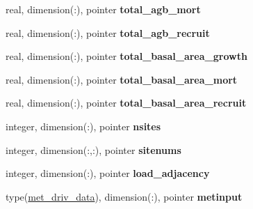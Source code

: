\begin{DoxyCompactItemize}
\item 
\hypertarget{structed__state__vars_1_1edtype_ae5714f7fd8d2db8b5a9487b7b77f53b7}{
real, dimension(:), pointer {\bfseries total\_\-agb\_\-mort}}
\label{structed__state__vars_1_1edtype_ae5714f7fd8d2db8b5a9487b7b77f53b7}

\item 
\hypertarget{structed__state__vars_1_1edtype_a551f812aa8bd6debc688863698d9cb92}{
real, dimension(:), pointer {\bfseries total\_\-agb\_\-recruit}}
\label{structed__state__vars_1_1edtype_a551f812aa8bd6debc688863698d9cb92}

\item 
\hypertarget{structed__state__vars_1_1edtype_abe5c6cdc1e2af3f2274e2bc0010025ec}{
real, dimension(:), pointer {\bfseries total\_\-basal\_\-area\_\-growth}}
\label{structed__state__vars_1_1edtype_abe5c6cdc1e2af3f2274e2bc0010025ec}

\item 
\hypertarget{structed__state__vars_1_1edtype_adee028cbf99464428f52e959dad4db6e}{
real, dimension(:), pointer {\bfseries total\_\-basal\_\-area\_\-mort}}
\label{structed__state__vars_1_1edtype_adee028cbf99464428f52e959dad4db6e}

\item 
\hypertarget{structed__state__vars_1_1edtype_a5a97c672ecc796920deb697f143fa16a}{
real, dimension(:), pointer {\bfseries total\_\-basal\_\-area\_\-recruit}}
\label{structed__state__vars_1_1edtype_a5a97c672ecc796920deb697f143fa16a}

\item 
\hypertarget{structed__state__vars_1_1edtype_aff6419cc579a89670113274fda53a267}{
integer, dimension(:), pointer {\bfseries nsites}}
\label{structed__state__vars_1_1edtype_aff6419cc579a89670113274fda53a267}

\item 
\hypertarget{structed__state__vars_1_1edtype_a5acd321a7c65ab1af15ddbc69227d951}{
integer, dimension(:,:), pointer {\bfseries sitenums}}
\label{structed__state__vars_1_1edtype_a5acd321a7c65ab1af15ddbc69227d951}

\item 
\hypertarget{structed__state__vars_1_1edtype_a6b147fe2967d0895fb12f6ae20708633}{
integer, dimension(:), pointer {\bfseries load\_\-adjacency}}
\label{structed__state__vars_1_1edtype_a6b147fe2967d0895fb12f6ae20708633}

\item 
\hypertarget{structed__state__vars_1_1edtype_a07b38ba395b1062ddc787ca921f33c4b}{
type(\hyperlink{structmet__driver__coms_1_1met__driv__data}{met\_\-driv\_\-data}), dimension(:), pointer {\bfseries metinput}}
\label{structed__state__vars_1_1edtype_a07b38ba395b1062ddc787ca921f33c4b}


\end{DoxyCompactItemize}

